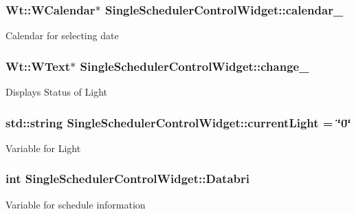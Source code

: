 \subsubsection[{\texorpdfstring{calendar\+\_\+}{calendar_}}]{\setlength{\rightskip}{0pt plus 5cm}Wt\+::\+W\+Calendar$\ast$ Single\+Scheduler\+Control\+Widget\+::calendar\+\_\+\hspace{0.3cm}{\ttfamily [private]}}\hypertarget{classSingleSchedulerControlWidget_ab6d7d409c6b686e460904b7c250824fd}{}\label{classSingleSchedulerControlWidget_ab6d7d409c6b686e460904b7c250824fd}
Calendar for selecting date 
\subsubsection[{\texorpdfstring{change\+\_\+}{change_}}]{\setlength{\rightskip}{0pt plus 5cm}Wt\+::\+W\+Text$\ast$ Single\+Scheduler\+Control\+Widget\+::change\+\_\+\hspace{0.3cm}{\ttfamily [private]}}\hypertarget{classSingleSchedulerControlWidget_a55fa60e9c72898895dcb2bd3740f544b}{}\label{classSingleSchedulerControlWidget_a55fa60e9c72898895dcb2bd3740f544b}
Displays Status of Light 
\subsubsection[{\texorpdfstring{current\+Light}{currentLight}}]{\setlength{\rightskip}{0pt plus 5cm}std\+::string Single\+Scheduler\+Control\+Widget\+::current\+Light = \char`\"{}0\char`\"{}\hspace{0.3cm}{\ttfamily [private]}}\hypertarget{classSingleSchedulerControlWidget_af4170d8a55962a3d2048f344516befff}{}\label{classSingleSchedulerControlWidget_af4170d8a55962a3d2048f344516befff}
Variable for Light 
\subsubsection[{\texorpdfstring{Databri}{Databri}}]{\setlength{\rightskip}{0pt plus 5cm}int Single\+Scheduler\+Control\+Widget\+::\+Databri\hspace{0.3cm}{\ttfamily [private]}}\hypertarget{classSingleSchedulerControlWidget_a97f81e542ac0cf7d0e4e7382755e51ab}{}\label{classSingleSchedulerControlWidget_a97f81e542ac0cf7d0e4e7382755e51ab}
Variable for schedule information 
